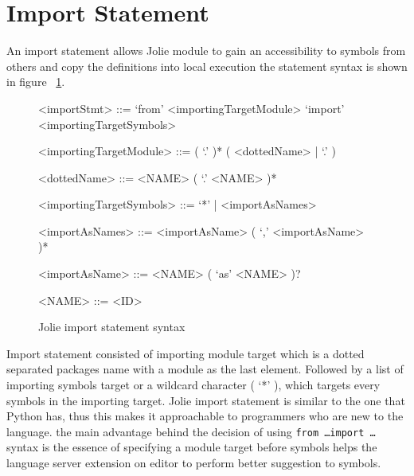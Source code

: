 
\section{Import Statement}
An import statement allows Jolie module to gain an accessibility to symbols from others and copy the definitions into local execution the statement syntax is shown in figure ~\ref{fig:jolie-import-stmt-syntax}.

\begin{figure}[ht]
    \begin{framed}
        \begin{grammar}
            <importStmt>
            ::= `from' <importingTargetModule> `import' <importingTargetSymbols>

            <importingTargetModule> ::= ( `.' )* ( <dottedName> | `.' )

            <dottedName>
            ::= <NAME> ( `.' <NAME> )*

            <importingTargetSymbols> ::=  `*' | <importAsNames>

            <importAsNames>
            ::= <importAsName> ( `,' <importAsName> )*

            <importAsName>
            ::= <NAME> ( `as' <NAME> )?

            <NAME> ::= <ID>
        \end{grammar}
    \end{framed}
    \caption{Jolie import statement syntax }
    \label{fig:jolie-import-stmt-syntax}
\end{figure}

Import statement consisted of importing module target which is a dotted separated packages name with a module as the last element. Followed by a list of importing symbols target or a wildcard character ( `*' ), which targets every symbols in the importing target.
Jolie import statement is similar to the one that Python has, thus this makes it approachable to programmers who are new to the language.
the main advantage behind the decision of using \texttt{from \dots import \dots} syntax is the essence of specifying a module target before symbols helps the language server extension on editor to perform better suggestion to symbols.
